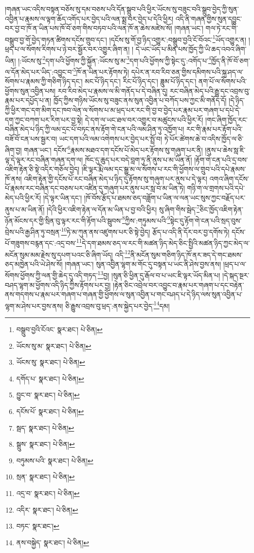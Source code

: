 །གཞན་ཡང་འདིས་བསྟན་བཅོས་སུ་དམ་བཅས་པའི་དོན་སྒྲུབ་པའི་ཕྱིར་ཡོངས་སུ་བཟུང་བའི་སྒྲུབ་བྱེད་ཀྱི་སུན་འབྱིན་པ་རྣམས་ལ་ལྟག་ཆོད་འགོད་པར་བྱེད་པའི་ལན་སྨྲ་བར་བྱེད་པ་དེའི་ཕྱིར། འདི་ནི་གཞན་གྱིས་སུན་དབྱུང་བར་བྱ་བ་ཁོ་ན་ཡིན་པས་ཁོ་བོ་ཅག་གིས་བཏབ་པའི་ལན་ཁོ་ན་ཆེས་མཛེས་སོ། །གཞན་ཡང་། གལ་ཏེ་རང་གི་བསྒྲུབ་བྱ་གོ་བྱེད་གཏན་ཚིགས་དངོས་གྲུབ་དང་། །དངོས་སུ་གོ་བྱ་ཉིད་འགྱུར་:བསྒྲུབ་བྱའི་ངོ་བོའང་\footnote{བསྒྲུབ་བྱའི་ངོའང་  སྣར་ཐང་།  པེ་ཅིན། }ཡོད་འགྱུར་ན། །ཕྲད་པ་ལ་སོགས་རིགས་པ་ཉེ་བར་སྦྱོར་བར་འགྱུར་ཞིག་ན། །
དེ་ཡང་ཡོད་པ་མིན་པས་ཁྱོད་ཀྱི་ཡི་ཆད་འབའ་ཞིག་ཡིན། །:ཡོངས་སུ་\footnote{ཡོངས་སུ་མ་  སྣར་ཐང་།  པེ་ཅིན། }དག་པའི་ཕྱོགས་ཀྱི་སྐྱོན་:ཡོངས་སུ་མ་\footnote{ཡོངས་སུ་  སྣར་ཐང་།  པེ་ཅིན། }དག་པའི་ཕྱོགས་ཀྱི་སྟེང་དུ་:འགོད་པ་\footnote{དགོད་པ་  སྣར་ཐང་།  པེ་ཅིན། }ཁྱོད་ནི་ཁོ་བོ་ཅག་ལ་དོན་མེད་པར་ཡིད་:འབྱུང་བ་\footnote{བྱུང་བ་  སྣར་ཐང་།  པེ་ཅིན། }ཁོ་ན་ཡིན་པར་རྟོགས་ཏེ། དཔེར་ན་རབ་རིབ་ཅན་གྱིས་དམིགས་པའི་སྐྲ་ཤད་ལ་སོགས་པ་རྣམས་ཀྱི་གཅིག་ཉིད་དང་། མང་པོ་ཉིད་དང་། རིང་པོ་ཉིད་དང་། ཟླུམ་པོ་ཉིད་དང་། ནག་པོ་ལ་སོགས་པའི་ཕྱོགས་སུན་འབྱིན་པས། རབ་རིབ་མེད་པ་རྣམས་ལ་མི་གནོད་པ་དེ་བཞིན་དུ། རང་བཞིན་མེད་པའི་རྒྱུ་དང་འབྲས་བུ་རྣམ་པར་དཔྱོད་པ་ན། ཁྱོད་ཀྱིས་གཉིས་ཡོངས་སུ་བཟུང་ནས་སུན་འབྱིན་པ་བཀོད་པས་ཀྱང་མི་གནོད་དོ། །དེ་ཉིད་ཀྱི་ཕྱིར་གང་དག་མིག་དང་ཁབ་ལེན་ལ་སོགས་པ་མ་ཕྲད་པར་རང་གི་བྱ་བ་བྱེད་པར་རྣམ་པར་གཞག་པ་དཔེ་དེ་དག་ཀྱང་བཀག་པར་རིག་པར་བྱ་སྟེ། དེ་དག་ལ་ཡང་ཐལ་བར་འགྱུར་བ་མཚུངས་པའི་ཕྱིར་རོ། །གང་ཞིག་ཁྱོད་རང་བཞིན་མེད་པ་ཉིད་ཀྱི་ལམ་དྲང་པོ་བཏང་ནས་རྟོག་གེ་ངན་པའི་ལམ་ཤིན་ཏུ་འཁྱོག་པ། རང་གི་རྣམ་པར་རྟོག་པའི་བཟོ་བོ་ངན་པས་སྦྱར་བ། ཡང་དག་པའི་ལམ་འགེགས་པར་བྱེད་པར་སྤྲོ་བ། ཏེ་པོར་ཚེགས་ཆེ་བ་འདིས་ཁྱོད་ལ་ཅི་ཞིག་བྱ། གཞན་ཡང་། དངོས་\footnote{དངོས་པོ་  སྣར་ཐང་།  པེ་ཅིན། }རྣམས་མཐའ་དག་དངོས་པོ་མེད་པར་རྟོགས་སུ་གཞུག་པར་ནི། །ནུས་པ་ཆེས་སླ་ཇི་ལྟ་དེ་ལྟར་རང་བཞིན་གཞན་དག་ལ། ཁོང་དུ་ཆུད་པར་བདེ་བླག་ཏུ་ནི་ནུས་པ་མ་ཡིན་ནོ། །རྟོག་གེ་ངན་པའི་དྲ་བས་འཇིག་རྟེན་ཅི་སྟེ་འདིར་གཅོལ་བྱེད། །ཇི་ལྟར་རྨི་ལམ་དང་སྒྱུ་མ་ལ་སོགས་པ་རང་གི་ཕྱོགས་ལ་གྲུབ་པའི་དཔེ་རྣམས་ཁོ་ནས། འཇིག་རྟེན་གྱི་དངོས་པོ་རང་བཞིན་མེད་པ་ཉིད་དུ་རྟོགས་སུ་གཞུག་པར་ནུས་པ་དེ་ལྟར། འགའ་ཞིག་དངོས་པོ་རྣམས་རང་བཞིན་དང་བཅས་པར་འཛིན་དུ་གཞུག་པར་ནུས་པར་སླ་བ་མ་ཡིན་ཏེ། གཉི་ག་ལ་གྲགས་པའི་དཔེ་མེད་པའི་ཕྱིར་རོ། །དེ་ལྟར་ཡིན་དང་། །ཁོ་བོས་རྩོད་པ་ཐམས་ཅད་བཟློག་པ་ཡིན་ལ་ལན་ཡང་སུས་ཀྱང་བརྗོད་པར་ནུས་པ་མ་ཡིན་ནོ། །དེའི་ཕྱིར་འཇིག་རྟེན་ལ་དོན་མ་ཡིན་པ་བྱ་བའི་ཕྱིར། སུ་ཞིག་གིས་སྦེད་\footnote{སྦད་  སྣར་ཐང་།  པེ་ཅིན། }ཅིང་ཁྱོད་འཇིག་རྟེན་ཉོན་མོངས་དར་གྱི་སྲིན་བུ་ལྟར་རང་གི་རྟོག་པའི་སྦུབས་\footnote{སྒྲུས་  སྣར་ཐང་།  པེ་ཅིན། }ཀྱིས་:གཏུམས་པའི་\footnote{བཏུམས་པའི་  སྣར་ཐང་།  པེ་ཅིན། }སྟེང་དུ་རྟོག་གེ་ངན་པའི་སྲད་བུས་བྲེས་པའི་རྒྱ་ཤིན་ཏུ་བསྲན་\footnote{སྲན་  སྣར་ཐང་།  པེ་ཅིན། }ཏེ་མ་ཀུན་ནས་འཛུགས་པར་ཅི་སྟེ་བྱེད། རྩོད་པ་འདི་ནི་དོར་བར་བྱ་དགོས་ཏེ། དངོས་པོ་གཟུགས་བརྙན་དང་:འདྲ་བས་\footnote{འདྲ་བ་  སྣར་ཐང་།  པེ་ཅིན། }དེ་དག་ཐམས་ཅད་ལ་རང་གི་མཚན་ཉིད་མེད་ཅིང་སྤྱིའི་མཚན་ཉིད་ཀྱང་མེད་ལ་མངོན་སུམ་མམ་རྗེས་སུ་དཔག་པའང་ཅི་ཞིག་ཡོད། འདི་\footnote{འདིར་  སྣར་ཐང་།  པེ་ཅིན། }ནི་མངོན་སུམ་གཅིག་ཉིད་ཁོ་ནར་ཟད་དེ་གང་ཐམས་ཅད་མཁྱེན་པའི་ཡེ་ཤེས་སོ། །གཞན་ཡང་། སུན་འབྱིན་ལྷག་མ་གོང་དུ་བསྟན་པ་ཡང་ནི་ཤེས་བྱས་ནས། །ཕྲད་པ་ལ་སོགས་ཕྱོགས་ཀྱི་ལན་གྱི་ཆེད་དུ་འདི་གཏད་\footnote{བཏང་  སྣར་ཐང་། }བྱ། །སུན་ཅི་ཕྱིན་དུ་རྒོལ་བ་པ་ཡང་ཇི་ལྟར་ཡོད་མིན་པ། །དེ་སྐད་སྔར་བཤད་ལྷག་མ་ཕྱོགས་འདི་ཉིད་ཀྱིས་རྟོགས་པར་བྱ། །རྟེན་ཅིང་འབྲེལ་བར་འབྱུང་བ་རྣམ་པར་གཞག་པ་དང་བརྟེན་ནས་གདགས་པ་རྣམ་པར་གཞག་པ་གཞན་གྱི་ཕྱོགས་ལ་སུན་འབྱིན་པ་གང་བཤད་པ་དེ་ཉིད་ལས་སུན་འབྱིན་པ་ལྷག་མ་ཤེས་པར་བྱས་ནས། ཅི་རྒྱུས་འབྲས་བུ་ཕྲད་:ནས་སྐྱེད་པར་བྱེད་\footnote{ནས་བསྐྱེད་  སྣར་ཐང་།  པེ་ཅིན། }དམ། 